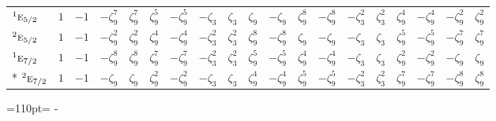 \documentclass[10pt,a4paper]{article}
\newcommand{\needspace}[1]{\par\penalty-100\begingroup\dimen0=#1\relax\dimen2=\pagegoal
  \advance\dimen2-\pagetotal\ifdim\dimen0>\dimen2\relax\ifdim\dimen2>0pt\vfil\break\fi\fi
  \endgroup}
\numberwithin{equation}{section}
\newcommand{\irr}[1]{\text{\normalfont\scshape #1}}
\newcommand{\conjpair}[1]{{}^{#1}}
\newcommand{\rootunity}[1]{\zeta_{#1}}
\begin{document}
{\begin{longtable}{@{}lcccccccccccccccccc@{}}
$\conjpair{1}\irr{e}_{5/2}$ & $1$ & $-1$ & $-\rootunity{9}^{7}$ & $\rootunity{9}^{7}$ & $\rootunity{9}^{5}$ & $-\rootunity{9}^{5}$ & $-\rootunity{3}$ & $\rootunity{3}$ & $\rootunity{9}$ & $-\rootunity{9}$ & $\rootunity{9}^{8}$ & $-\rootunity{9}^{8}$ & $-\rootunity{3}^{2}$ & $\rootunity{3}^{2}$ & $\rootunity{9}^{4}$ & $-\rootunity{9}^{4}$ & $-\rootunity{9}^{2}$ & $\rootunity{9}^{2}$\\
$\conjpair{2}\irr{e}_{5/2}$ & $1$ & $-1$ & $-\rootunity{9}^{2}$ & $\rootunity{9}^{2}$ & $\rootunity{9}^{4}$ & $-\rootunity{9}^{4}$ & $-\rootunity{3}^{2}$ & $\rootunity{3}^{2}$ & $\rootunity{9}^{8}$ & $-\rootunity{9}^{8}$ & $\rootunity{9}$ & $-\rootunity{9}$ & $-\rootunity{3}$ & $\rootunity{3}$ & $\rootunity{9}^{5}$ & $-\rootunity{9}^{5}$ & $-\rootunity{9}^{7}$ & $\rootunity{9}^{7}$\\
$\conjpair{1}\irr{e}_{7/2}$ & $1$ & $-1$ & $-\rootunity{9}^{8}$ & $\rootunity{9}^{8}$ & $\rootunity{9}^{7}$ & $-\rootunity{9}^{7}$ & $-\rootunity{3}^{2}$ & $\rootunity{3}^{2}$ & $\rootunity{9}^{5}$ & $-\rootunity{9}^{5}$ & $\rootunity{9}^{4}$ & $-\rootunity{9}^{4}$ & $-\rootunity{3}$ & $\rootunity{3}$ & $\rootunity{9}^{2}$ & $-\rootunity{9}^{2}$ & $-\rootunity{9}$ & $\rootunity{9}$\\*
$\conjpair{2}\irr{e}_{7/2}$ & $1$ & $-1$ & $-\rootunity{9}$ & $\rootunity{9}$ & $\rootunity{9}^{2}$ & $-\rootunity{9}^{2}$ & $-\rootunity{3}$ & $\rootunity{3}$ & $\rootunity{9}^{4}$ & $-\rootunity{9}^{4}$ & $\rootunity{9}^{5}$ & $-\rootunity{9}^{5}$ & $-\rootunity{3}^{2}$ & $\rootunity{3}^{2}$ & $\rootunity{9}^{7}$ & $-\rootunity{9}^{7}$ & $-\rootunity{9}^{8}$ & $\rootunity{9}^{8}$\\
\bottomrule\end{longtable}}
\needspace{110pt}
\end{document}
